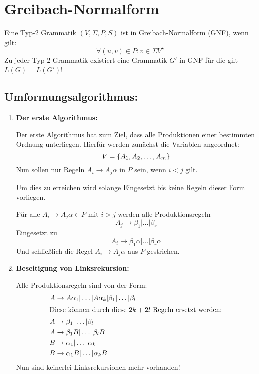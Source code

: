 \section{Greibach-Normalform}
Eine Typ-2 Grammatik $(V,\Sigma,P,S)$ ist in Greibach-Normalform (GNF),  wenn gilt:
\begin{equation*}
	\forall (u,v)\in P: v\in \Sigma V^\star
\end{equation*}
Zu jeder Typ-2 Grammatik existiert eine Grammatik $G'$ in GNF für die gilt $L(G)=L(G')$!

\subsection{Umformungsalgorithmus:}
\begin{enumerate}
	\item \textbf{Der erste Algorithmus:}

	Der erste Algorithmus hat zum Ziel, dass alle Produktionen einer bestimmten Ordnung unterliegen.
	Hierfür werden zunächst die Variablen angeordnet:
	\begin{equation*}
		V=\left\{ A_1,A_2,\ldots,A_m \right\}
	\end{equation*}
	Nun sollen nur Regeln $A_i\rightarrow A_j\alpha$ in $P$ sein, wenn $i<j$ gilt.

	Um dies zu erreichen wird solange Eingesetzt bis keine Regeln dieser Form vorliegen.

	Für alle $A_i\rightarrow A_j\alpha \in P$ mit $i> j$ werden alle Produktionsregeln
	\begin{equation*}
		A_j\rightarrow \beta_1|\ldots|\beta_r
	\end{equation*}
	Eingesetzt zu
	\begin{equation*}
		A_i\rightarrow \beta_1\alpha|\ldots|\beta_r\alpha
	\end{equation*}
	Und schließlich die Regel $A_i\rightarrow A_j\alpha$ aus $P$ gestrichen.

	\item \textbf{Beseitigung von Linksrekursion:}

	Alle Produktionsregeln sind von der Form:
	\begin{align*}
		A&\rightarrow A\alpha_1|\ldots|A\alpha_k|\beta_1|\ldots|\beta_l\\
		\intertext{Diese können durch diese $2k+2l$ Regeln ersetzt werden:}
		A&\rightarrow \beta_1|\ldots|\beta_l\\
		A&\rightarrow \beta_1B|\ldots|\beta_lB\\
		B&\rightarrow \alpha_1|\ldots|\alpha_k\\
		B&\rightarrow \alpha_1B|\ldots|\alpha_kB
	\end{align*}%
	Nun sind keinerlei Linksrekursionen mehr vorhanden!


\end{enumerate}
